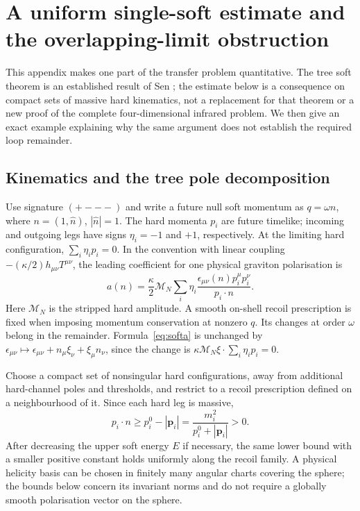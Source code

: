 \section{A uniform single-soft estimate and the overlapping-limit obstruction}\label{app:softremainder}

This appendix makes one part of the transfer problem quantitative. The tree soft theorem is an established result of Sen \cite{Sen17tree}; the estimate below is a consequence on compact sets of massive hard kinematics, not a replacement for that theorem or a new proof of the complete four-dimensional infrared problem. We then give an exact example explaining why the same argument does not establish the required loop remainder.

\subsection{Kinematics and the tree pole decomposition}

Use signature $(+---)$ and write a future null soft momentum as $q=\omega n$, where $n=(1,\widehat n)$, $|\widehat n|=1$. The hard momenta $p_i$ are future timelike; incoming and outgoing legs have signs $\eta_i=-1$ and $+1$, respectively. At the limiting hard configuration, $\sum_i\eta_i p_i=0$. In the convention with linear coupling $-(\kappa/2)h_{\mu\nu}T^{\mu\nu}$, the leading coefficient for one physical graviton polarisation is
\begin{equation}\label{eq:softa}
 a(n)=\frac{\kappa}{2}\mathcal M_N
       \sum_i\eta_i\frac{\epsilon_{\mu\nu}(n)p_i^\mu p_i^\nu}{p_i\cdot n}.
\end{equation}
Here $\mathcal M_N$ is the stripped hard amplitude. A smooth on-shell recoil prescription is fixed when imposing momentum conservation at nonzero $q$. Its changes at order $\omega$ belong in the remainder. Formula~\eqref{eq:softa} is unchanged by $\epsilon_{\mu\nu}\mapsto\epsilon_{\mu\nu}+n_\mu\xi_\nu+\xi_\mu n_\nu$, since the change is $\kappa\mathcal M_N\xi\cdot\sum_i\eta_i p_i=0$.

Choose a compact set of nonsingular hard configurations, away from additional hard-channel poles and thresholds, and restrict to a recoil prescription defined on a neighbourhood of it. Since each hard leg is massive,
\begin{equation}\label{eq:massivegap}
 p_i\cdot n\ge p_i^0-|\boldsymbol p_i|
 =\frac{m_i^2}{p_i^0+|\boldsymbol p_i|}>0.
\end{equation}
After decreasing the upper soft energy $E$ if necessary, the same lower bound with a smaller positive constant holds uniformly along the recoil family. A physical helicity basis can be chosen in finitely many angular charts covering the sphere; the bounds below concern its invariant norms and do not require a globally smooth polarisation vector on the sphere.

